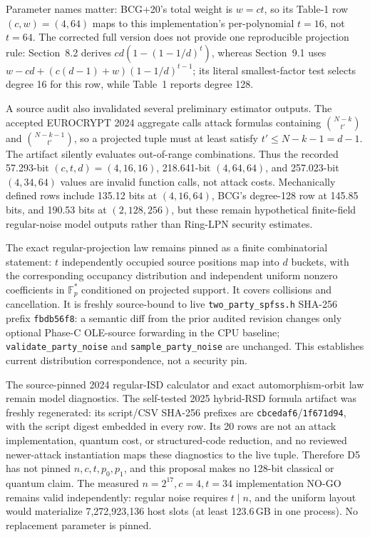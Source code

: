 \documentclass[11pt]{article}
\begin{document}
Parameter names matter: BCG+20's total weight is $w=ct$, so its Table-1 row
$(c,w)=(4,64)$ maps to this implementation's per-polynomial $t=16$, not
$t=64$. The corrected full version does not provide one reproducible
projection rule: Section~8.2 derives
$c d(1-(1-1/d)^t)$, whereas Section~9.1 uses
$w-cd+(c(d-1)+w)(1-1/d)^{t-1}$; its literal smallest-factor test selects
degree 16 for this row, while Table~1 reports degree 128.

A source audit also invalidated several preliminary estimator outputs. The
accepted EUROCRYPT 2024 aggregate calls attack formulas containing
$\binom{N-k}{t'}$ and $\binom{N-k-1}{t'}$, so a projected tuple must at least
satisfy $t'\le N-k-1=d-1$. The artifact silently evaluates out-of-range
combinations. Thus the recorded 57.293-bit $(c,t,d)=(4,16,16)$, 218.641-bit
$(4,64,64)$, and 257.023-bit $(4,34,64)$ values are invalid function calls,
not attack costs. Mechanically defined rows include 135.12 bits at
$(4,16,64)$, BCG's degree-128 row at 145.85 bits, and 190.53 bits at
$(2,128,256)$, but these remain hypothetical finite-field regular-noise model
outputs rather than Ring-LPN security estimates.

The exact regular-projection law remains pinned as a finite combinatorial
statement: $t$ independently occupied source positions map into $d$ buckets,
with the corresponding occupancy distribution and independent uniform
nonzero coefficients in $\mathbb F_p^*$ conditioned on projected support.
It covers collisions and cancellation. It is freshly source-bound to live
\texttt{two\_party\_spfss.h} SHA-256 prefix \texttt{fbdb56f8}: a semantic diff
from the prior audited revision changes only optional Phase-C OLE-source
forwarding in the CPU baseline; \texttt{validate\_party\_noise} and
\texttt{sample\_party\_noise} are unchanged. This establishes current
distribution correspondence, not a security pin.

The source-pinned 2024 regular-ISD calculator and exact automorphism-orbit law
remain model diagnostics. The self-tested 2025 hybrid-RSD formula artifact was
freshly regenerated: its script/CSV SHA-256 prefixes are
\texttt{cbcedaf6}/\texttt{1f671d94}, with the script digest embedded in every
row. Its 20 rows are not an attack implementation, quantum cost, or
structured-code reduction, and no reviewed newer-attack instantiation maps
these diagnostics to the live tuple.
Therefore D5 has not pinned $n,c,t,p_0,p_1$, and this proposal makes no
128-bit classical or quantum claim. The measured $n=2^{17},c=4,t=34$
implementation NO-GO remains valid independently: regular noise requires
$t\mid n$, and the uniform layout would materialize 7{,}272{,}923{,}136 host
slots (at least 123.6\,GB in one process). No replacement parameter is pinned.
\end{document}
